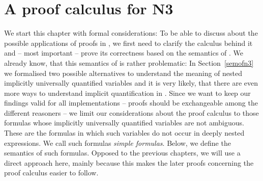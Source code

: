 \section{A proof calculus for N3}
\label{nthree}
We start this chapter with formal considerations: To be able to discuss about the possible applications of proofs in \nthree, we first need to 
clarify the calculus behind it and -- most important -- prove its correctness based on the semantics of \nthree. We already know, 
that this semantics of \nthree is 
rather problematic: In Section~\ref{semofn3} we formalised two possible alternatives to understand the meaning of nested implicitly universally quantified variables
and it is very likely, that there are even more ways to understand implicit quantification in \nthree. 
Since we want to keep our findings valid for all implementations -- proofs should 
be exchangeable among the different reasoners -- we limit our considerations about the proof calculus to those formulas whose implicitly universally
quantified variables are not ambiguous. These are the formulas in which such variables do not occur in deeply nested expressions. We call such formulas \emph{simple formulas}. 
Below, we define the semantics of such formulas. %
Opposed to the previous chapters, we will use a direct approach here, mainly because this makes the later proofs concerning the proof calculus easier to follow. 
 




